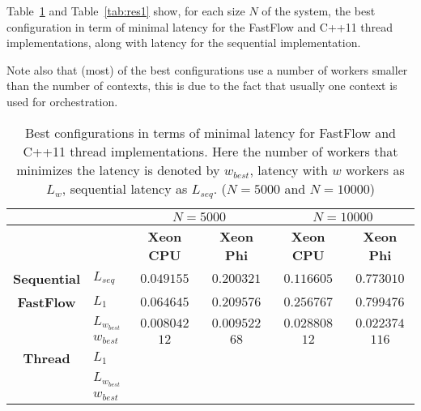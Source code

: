Table~\ref{tab:res0} and Table~\ref{tab:res1} show, for each size $N$ of the system, the best configuration in term of minimal latency for the FastFlow and C++11 thread implementations, along with latency for the sequential implementation.

Note also that (most) of the best configurations use a number of workers smaller than the number of contexts, this is due to the fact that usually one context is used for orchestration.
\begin{table}[h]
	\centering
	\begin{tabular}{clcccc}  
		\toprule
		& & \multicolumn{2}{c}{\textbf{$N = 5000$}} & \multicolumn{2}{c}{\textbf{$N = 10000$}}\\
		\midrule
		& & \textbf{Xeon CPU} & \textbf{Xeon Phi} & \textbf{Xeon CPU} & \textbf{Xeon Phi}\\
		\cmidrule{3-6}		
		\textbf{Sequential} & $L_{seq}$ & $0.049155$& $0.200321$ & $0.116605$& $0.773010$\\
		\midrule
		\textbf{FastFlow} & $L_1$ & $0.064645$ & $0.209576$ & $0.256767$ & $0.799476$\\
		& $L_{w_{best}}$ & $0.008042$ & $0.009522$ & $0.028808$ & $0.022374$\\
		& $w_{best}$ & $12$ & $68$ & $12$ & $116$\\
		\midrule
		\textbf{Thread} & $L_1$ & $ $ & $ $ & $ $ & $ $\\
		& $L_{w_{best}}$ & $ $ & $ $ & $ $ & $ $\\
		& $w_{best}$ & $ $ & $ $ & $ $ & $ $ \\
		\bottomrule
	\end{tabular}
	\caption{Best configurations in terms of minimal latency for FastFlow and C++11 thread implementations. 
		Here the number of workers that minimizes the latency is denoted by $w_{best}$, latency with $w$ workers as $L_w$, sequential latency as $L_{seq}$. ($N = 5000$ and $N=10000$)}
	\label{tab:res0}
\end{table}
~
